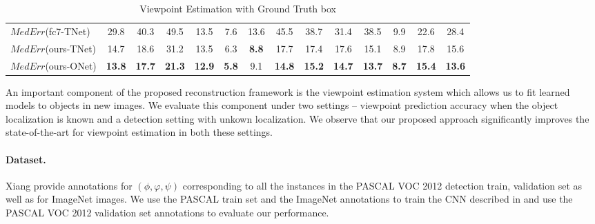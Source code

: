\begin{table*}
{\begin{tabular}{lcccccccccccc|c}
{\footnotesize{}$MedErr$(fc7-TNet)} & {\footnotesize{}29.8} & {\footnotesize{}40.3} & {\footnotesize{}49.5} & {\footnotesize{}13.5} & {\footnotesize{}7.6} & {\footnotesize{}13.6} & {\footnotesize{}45.5} & {\footnotesize{}38.7} & {\footnotesize{}31.4} & {\footnotesize{}38.5} & {\footnotesize{}9.9} & {\footnotesize{}22.6} & {\footnotesize{}28.4}\tabularnewline
{\footnotesize{}$MedErr$(ours-TNet)} & {\footnotesize{}14.7} & {\footnotesize{}18.6} & {\footnotesize{}31.2} & {\footnotesize{}13.5} & {\footnotesize{}6.3} & \textbf{\footnotesize{}8.8} & {\footnotesize{}17.7} & {\footnotesize{}17.4} & {\footnotesize{}17.6} & {\footnotesize{}15.1} & {\footnotesize{}8.9} & {\footnotesize{}17.8} & {\footnotesize{}15.6}\tabularnewline
{\footnotesize{}$MedErr$(ours-ONet)} & \textbf{\footnotesize{}13.8} & \textbf{\footnotesize{}17.7} & \textbf{\footnotesize{}21.3} & \textbf{\footnotesize{}12.9} & \textbf{\footnotesize{}5.8} & {\footnotesize{}9.1} & \textbf{\footnotesize{}14.8} & \textbf{\footnotesize{}15.2} & \textbf{\footnotesize{}14.7} & \textbf{\footnotesize{}13.7} & \textbf{\footnotesize{}8.7} & \textbf{\footnotesize{}15.4} & \textbf{\footnotesize{}13.6}\tabularnewline
\bottomrule
\end{tabular}}
\caption{Viewpoint Estimation with Ground Truth box}
\label{table:poseGtEval}
\end{table*}

An important component of the proposed reconstruction framework is the viewpoint estimation system  which allows us to fit learned models to objects in new images. We evaluate this component under two settings -- viewpoint prediction accuracy when the object localization is known and a detection setting with unkown localization. We observe that our proposed approach significantly improves the state-of-the-art for viewpoint estimation in both these settings.


\paragraph{Dataset.}
Xiang \etal \cite{pascal3d} provide annotations for $(\phi,\varphi,\psi)$ corresponding to all the instances in the PASCAL VOC 2012 detection train, validation set as well as for ImageNet images. We use the PASCAL train set and the ImageNet annotations to train the CNN described in  and use the PASCAL VOC 2012 validation set annotations to evaluate our performance. 


